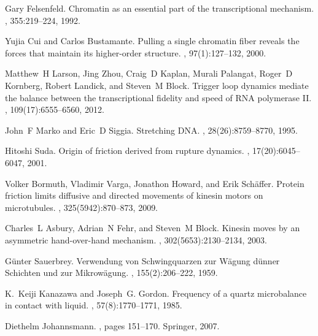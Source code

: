 \documentclass[floatfix,superscriptaddress,a4paper,twocolumn]{revtex4-1}
\begin{document}
\begin{thebibliography}{10}

  Gary Felsenfeld.
  \newblock Chromatin as an essential part of the transcriptional mechanism.
  , 355:219--224, 1992.

  Yujia Cui and Carlos Bustamante.
  \newblock Pulling a single chromatin fiber reveals the forces that maintain its
  higher-order structure.
  ,
  97(1):127--132, 2000.

  Matthew~H Larson, Jing Zhou, Craig~D Kaplan, Murali Palangat, Roger~D Kornberg,
  Robert Landick, and Steven~M Block.
  \newblock Trigger loop dynamics mediate the balance between the transcriptional
  fidelity and speed of {RNA} polymerase {II}.
  ,
  109(17):6555--6560, 2012.

  John~F Marko and Eric~D Siggia.
  \newblock Stretching {DNA}.
  , 28(26):8759--8770, 1995.

  Hitoshi Suda.
  \newblock Origin of friction derived from rupture dynamics.
  , 17(20):6045--6047, 2001.

  Volker Bormuth, Vladimir Varga, Jonathon Howard, and Erik Sch{\"a}ffer.
  \newblock Protein friction limits diffusive and directed movements of kinesin
  motors on microtubules.
  , 325(5942):870--873, 2009.

  Charles~L Asbury, Adrian~N Fehr, and Steven~M Block.
  \newblock Kinesin moves by an asymmetric hand-over-hand mechanism.
  , 302(5653):2130--2134, 2003.

  G{\"u}nter Sauerbrey.
  \newblock Verwendung von {S}chwingquarzen zur {W}{\"a}gung d{\"u}nner
  {S}chichten und zur {M}ikrow{\"a}gung.
  , 155(2):206--222, 1959.

  K.~Keiji Kanazawa and Joseph~G. Gordon.
  \newblock Frequency of a quartz microbalance in contact with liquid.
  , 57(8):1770--1771, 1985.

  Diethelm Johannsmann.
  , pages 151--170.
  \newblock Springer, 2007.


\end{thebibliography}
\end{document}
